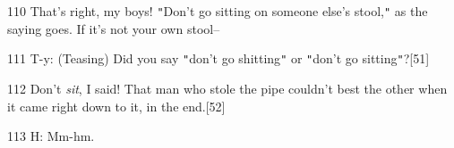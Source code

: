 110 That's right, my boys! \texttt{"}Don't go sitting on someone else's stool,\texttt{"}
as the saying goes. If it's not your own stool--

111 T-y: (Teasing) Did you say \texttt{"}don't go shitting\texttt{"} or \texttt{"}don't
go sitting\texttt{"}?[51]

112 Don't \textit{sit}, I said! That man who stole the pipe couldn't best the other
when it came right down to it, in the end.[52]

113 H: Mm-hm.

